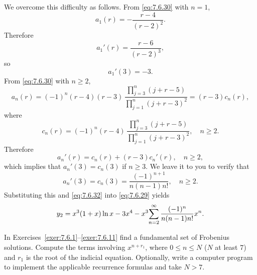 \begin{examplesolution}
We overcome this difficulty as follows. From \eqref{eq:7.6.30} with $n=1$,
\[
  a_{1}(r)=-\frac{r-4}{(r-2)^{2}}.
\]
Therefore
\[
  a_{1}'(r)=\frac{r-6}{(r-2)^{3}},
\]
so
\begin{equation}
  \label{eq:7.6.32}a_{1}'(3)=-3.
\end{equation}
From \eqref{eq:7.6.30} with $n\ge2$,
\[
  a_{n}(r)=(-1)^{n}(r-4)(r-3)\,\frac{\prod_{j=3}^{n}(j+r-5)}{\prod_{j=1}^{n}(j+r-3)^{2}}=(r-3)c_{n}(r),
\]
where
\[
  c_{n}(r)=(-1)^{n}(r-4)\, \frac{\prod_{j=3}^{n}(j+r-5)}{\prod_{j=1}^{n}(j+r-3)^{2}},\quad n\ge2.
\]
Therefore
\[
  a_{n}'(r)=c_{n}(r)+(r-3)c_{n}'(r),\quad n\ge2,
\]
which implies that $a_{n}'(3)=c_{n}(3)$ if $n\ge3$. We leave it to you to verify that
\[
  a_{n}'(3)=c_{n}(3)=\frac{(-1)^{n+1}}{n(n-1)n!},\quad n\ge2.
\]
Substituting this and \eqref{eq:7.6.32} into \eqref{eq:7.6.29} yields
\[
  y_{2}=x^{3}(1+x)\ln x-3x^{4}-x^{3}\displaystyle{\sum_{n=2}^{\infty}\frac{(-1)^{n}}{n(n-1)n!}x^{n}}.
\]
\end{examplesolution}

\exercises In Exercises~\ref{exer:7.6.1}--\ref{exer:7.6.11} find a fundamental set of Frobenius solutions. Compute the terms involving $x^{n+r_{1}}$, where $0\le n\le N$ ($N$ at least $7$) and $r_{1}$ is the root of the indicial equation. Optionally, write a computer program to implement the applicable recurrence formulas and take $N>7$.

